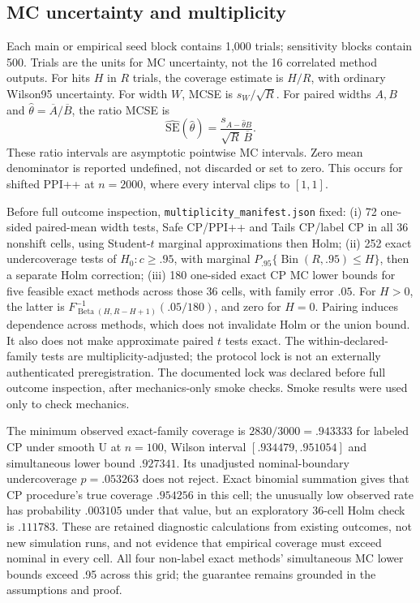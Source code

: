 \documentclass{article}
\begin{document}
\subsection{MC uncertainty and multiplicity}
Each main or empirical seed block contains 1,000 trials; sensitivity blocks contain 500. Trials are the units for MC uncertainty, not the 16 correlated method outputs. For hits $H$ in $R$ trials, the coverage estimate is $H/R$, with ordinary Wilson95 uncertainty. For width $W$, MCSE is $s_W/\sqrt R$. For paired widths $A,B$ and $\widehat\theta=\overline A/\overline B$, the ratio MCSE is
\begin{equation}\label{eq:ratiose}
 \widehat{\mathrm{SE}}(\widehat\theta)=\frac{s_{A-\widehat\theta B}}{\sqrt R\,\overline B}.
\end{equation}
These ratio intervals are asymptotic pointwise MC intervals. Zero mean denominator is reported undefined, not discarded or set to zero. This occurs for shifted PPI++ at $n=2000$, where every interval clips to $[1,1]$.

Before full outcome inspection, \texttt{multiplicity\_manifest.json} fixed: (i) 72 one-sided paired-mean width tests, Safe CP/PPI++ and Tails CP/label CP in all 36 nonshift cells, using Student-$t$ marginal approximations then Holm; (ii) 252 exact undercoverage tests of $H_0:c\geq.95$, with marginal $P_{.95}\{\operatorname{Bin}(R,.95)\leq H\}$, then a separate Holm correction; (iii) 180 one-sided exact CP MC lower bounds for five feasible exact methods across those 36 cells, with family error $.05$. For $H>0$, the latter is $F^{-1}_{\operatorname{Beta}(H,R-H+1)}(.05/180)$, and zero for $H=0$. Pairing induces dependence across methods, which does not invalidate Holm or the union bound. It also does not make approximate paired $t$ tests exact. The within-declared-family tests are multiplicity-adjusted; the protocol lock is not an externally authenticated preregistration. The documented lock was declared before full outcome inspection, after mechanics-only smoke checks. Smoke results were used only to check mechanics.

The minimum observed exact-family coverage is $2830/3000=.943333$ for labeled CP under smooth U at $n=100$, Wilson interval $[.934479,.951054]$ and simultaneous lower bound $.927341$. Its unadjusted nominal-boundary undercoverage $p=.053263$ does not reject. Exact binomial summation gives that CP procedure's true coverage $.954256$ in this cell; the unusually low observed rate has probability $.003105$ under that value, but an exploratory 36-cell Holm check is $.111783$. These are retained diagnostic calculations from existing outcomes, not new simulation runs, and not evidence that empirical coverage must exceed nominal in every cell. All four non-label exact methods' simultaneous MC lower bounds exceed .95 across this grid; the guarantee remains grounded in the assumptions and proof.
\end{document}
